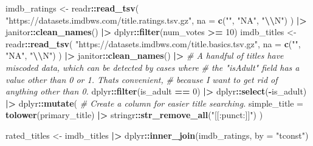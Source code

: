 \documentclass[
]{article}
\newenvironment{Shaded}{\begin{snugshade}}{\end{snugshade}}
\newcommand{\AttributeTok}[1]{\textcolor[rgb]{0.13,0.29,0.53}{#1}}
\newcommand{\CommentTok}[1]{\textcolor[rgb]{0.56,0.35,0.01}{\textit{#1}}}
\newcommand{\DecValTok}[1]{\textcolor[rgb]{0.00,0.00,0.81}{#1}}
\newcommand{\FunctionTok}[1]{\textcolor[rgb]{0.13,0.29,0.53}{\textbf{#1}}}
\newcommand{\NormalTok}[1]{#1}
\newcommand{\OtherTok}[1]{\textcolor[rgb]{0.56,0.35,0.01}{#1}}
\newcommand{\SpecialCharTok}[1]{\textcolor[rgb]{0.81,0.36,0.00}{\textbf{#1}}}
\newcommand{\StringTok}[1]{\textcolor[rgb]{0.31,0.60,0.02}{#1}}
\begin{document}
\begin{Shaded}
\begin{Highlighting}[]
\NormalTok{imdb\_ratings }\OtherTok{\textless{}{-}}\NormalTok{ readr}\SpecialCharTok{::}\FunctionTok{read\_tsv}\NormalTok{(}
  \StringTok{"https://datasets.imdbws.com/title.ratings.tsv.gz"}\NormalTok{,}
  \AttributeTok{na =} \FunctionTok{c}\NormalTok{(}\StringTok{""}\NormalTok{, }\StringTok{"NA"}\NormalTok{, }\StringTok{"}\SpecialCharTok{\textbackslash{}\textbackslash{}}\StringTok{N"}\NormalTok{)}
\NormalTok{) }\SpecialCharTok{|\textgreater{}} 
\NormalTok{  janitor}\SpecialCharTok{::}\FunctionTok{clean\_names}\NormalTok{() }\SpecialCharTok{|\textgreater{}} 
\NormalTok{  dplyr}\SpecialCharTok{::}\FunctionTok{filter}\NormalTok{(num\_votes }\SpecialCharTok{\textgreater{}=} \DecValTok{10}\NormalTok{)}
\NormalTok{imdb\_titles }\OtherTok{\textless{}{-}}\NormalTok{ readr}\SpecialCharTok{::}\FunctionTok{read\_tsv}\NormalTok{(}
  \StringTok{"https://datasets.imdbws.com/title.basics.tsv.gz"}\NormalTok{,}
  \AttributeTok{na =} \FunctionTok{c}\NormalTok{(}\StringTok{""}\NormalTok{, }\StringTok{"NA"}\NormalTok{, }\StringTok{"}\SpecialCharTok{\textbackslash{}\textbackslash{}}\StringTok{N"}\NormalTok{)}
\NormalTok{) }\SpecialCharTok{|\textgreater{}} 
\NormalTok{  janitor}\SpecialCharTok{::}\FunctionTok{clean\_names}\NormalTok{() }\SpecialCharTok{|\textgreater{}} 
  \CommentTok{\# A handful of titles have miscoded data, which can be detected by cases where}
  \CommentTok{\# the "isAdult" field has a value other than 0 or 1. That\textquotesingle{}s convenient,}
  \CommentTok{\# because I want to get rid of anything other than 0.}
\NormalTok{  dplyr}\SpecialCharTok{::}\FunctionTok{filter}\NormalTok{(is\_adult }\SpecialCharTok{==} \DecValTok{0}\NormalTok{) }\SpecialCharTok{|\textgreater{}}
\NormalTok{  dplyr}\SpecialCharTok{::}\FunctionTok{select}\NormalTok{(}\SpecialCharTok{{-}}\NormalTok{is\_adult) }\SpecialCharTok{|\textgreater{}}
\NormalTok{  dplyr}\SpecialCharTok{::}\FunctionTok{mutate}\NormalTok{(}
    \CommentTok{\# Create a column for easier title searching.}
    \AttributeTok{simple\_title =} \FunctionTok{tolower}\NormalTok{(primary\_title) }\SpecialCharTok{|\textgreater{}} 
\NormalTok{      stringr}\SpecialCharTok{::}\FunctionTok{str\_remove\_all}\NormalTok{(}\StringTok{"[[:punct:]]"}\NormalTok{)}
\NormalTok{  )}

\NormalTok{rated\_titles }\OtherTok{\textless{}{-}}\NormalTok{ imdb\_titles }\SpecialCharTok{|\textgreater{}} 
\NormalTok{  dplyr}\SpecialCharTok{::}\FunctionTok{inner\_join}\NormalTok{(imdb\_ratings, }\AttributeTok{by =} \StringTok{"tconst"}\NormalTok{)}


\end{Highlighting}
\end{Shaded}
\end{document}
